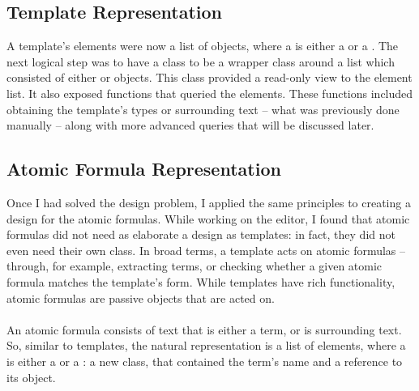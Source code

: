 \documentclass[../main.tex]{subfiles}
\begin{document}
\subsection{Template Representation}
A template's elements were now a list of  objects, where a  is either a  or a .
The next logical step was to have a  class to be a wrapper class around a list which consisted of either  or  objects. This  class provided a read-only view to the element list. It also exposed functions that queried the elements. These functions included obtaining the template's types or surrounding text -- what was previously done manually -- along with more advanced queries that will be discussed later.

\subsection{Atomic Formula Representation}
Once I had solved the  design problem, I applied the same principles to creating a design for the atomic formulas. While working on the editor, I found that atomic formulas did not need as elaborate a design as templates: in fact, they did not even need their own class. In broad terms, a template acts on atomic formulas -- through, for example, extracting terms, or checking whether a given atomic formula matches the template's form. While templates have rich functionality, atomic formulas are passive objects that are acted on.
\\
\\
An atomic formula consists of text that is either a term, or is surrounding text. So, similar to templates, the natural representation is a list of  elements, where a  is either a  or a : a new class, that contained the term's name and a reference to its  object. 

\end{document}
